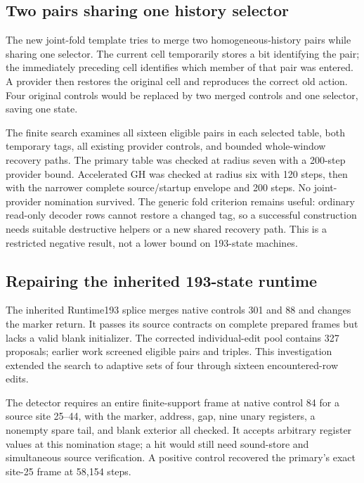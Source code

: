 \documentclass[11pt,letterpaper]{article}
\begin{document}
\subsection{Two pairs sharing one history selector}

The new joint-fold template tries to merge two homogeneous-history pairs
while sharing one selector. The current cell temporarily stores a bit
identifying the pair; the immediately preceding cell identifies which
member of that pair was entered. A provider then restores the original
cell and reproduces the correct old action. Four original controls would
be replaced by two merged controls and one selector, saving one state.

The finite search examines all sixteen eligible pairs in each selected
table, both temporary tags, all existing provider controls, and bounded
whole-window recovery paths. The primary table was checked at radius
seven with a 200-step provider bound. Accelerated GH was checked at
radius six with 120 steps, then with the narrower complete source/startup
envelope and 200 steps. No joint-provider nomination survived. The
generic fold criterion remains useful: ordinary read-only decoder rows
cannot restore a changed tag, so a successful construction needs suitable
destructive helpers or a new shared recovery path. This is a restricted
negative result, not a lower bound on 193-state machines.

\subsection{Repairing the inherited 193-state runtime}

The inherited Runtime193 splice merges native controls 301 and 88 and
changes the marker return. It passes its source contracts on complete
prepared frames but lacks a valid blank initializer. The corrected
individual-edit pool contains 327 proposals; earlier work screened
eligible pairs and triples. This investigation extended the search to
adaptive sets of four through sixteen encountered-row edits.

The detector requires an entire finite-support frame at native control
84 for a source site 25--44, with the marker, address, gap, nine unary
registers, a nonempty spare tail, and blank exterior all checked. It
accepts arbitrary register values at this nomination stage; a hit would
still need sound-store and simultaneous source verification. A positive
control recovered the primary's exact site-25 frame at 58,154 steps.
\end{document}
